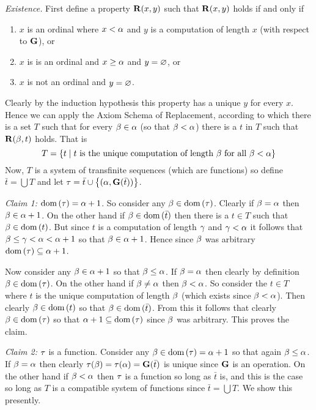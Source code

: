 \begin{questions}
{{      \emph{Existence.} First define a property $\mathbf{R}(x,y)$ such that $\mathbf{R}(x,y)$ holds if and only if
      \begin{enumerate}
        \item $x$ is an ordinal where $x < \alpha$ and $y$ is a computation of length $x$ (with respect to $\mathbf{G}$), or
        \item $x$ is is an ordinal and $x \geq \alpha$ and $y = \varnothing$, or
        \item $x$ is not an ordinal and $y = \varnothing$.
      \end{enumerate}
      Clearly by the induction hypothesis this property has a unique $y$ for every $x$.
      Hence we can apply the Axiom Schema of Replacement, according to which there is a set $T$ such that for every $\beta \in \alpha$ (so that $\beta < \alpha$) there is a $t$ in $T$ such that $\mathbf{R}(\beta, t)$ holds.
      That is
      $$
        T = \left\{ t \mid t \text{ is the unique computation of length $\beta$ for all $\beta < \alpha$} \right\}
      $$
      Now, $T$ is a system of transfinite sequences (which are functions) so define $\bar{t} = \bigcup T$ and let $\tau = \bar{t} \cup \left\{ (\alpha, \mathbf{G}(\bar{t})) \right\}$.

      \emph{Claim 1:} $\mathrm{dom}\,(\tau) = \alpha+1$.
      So consider any $\beta \in \mathrm{dom}\,(\tau)$.
      Clearly if $\beta = \alpha$ then $\beta \in \alpha+1$.
      On the other hand if $\beta \in \mathrm{dom}\,(\bar{t})$ then there is a $t \in T$ such that $\beta \in \mathrm{dom}\,(t)$.
      But since $t$ is a computation of length $\gamma$ and $\gamma < \alpha$ it follows that $\beta \leq \gamma < \alpha < \alpha+1$ so that $\beta \in \alpha+1$.
      Hence since $\beta$ was arbitrary $\mathrm{dom}\,(\tau) \subseteq \alpha+1$.

      Now consider any $\beta \in \alpha+1$ so that $\beta \leq \alpha$.
      If $\beta = \alpha$ then clearly by definition $\beta \in \mathrm{dom}\,(\tau)$.
      On the other hand if $\beta \neq \alpha$ then $\beta < \alpha$.
      So consider the $t \in T$ where $t$ is the unique computation of length $\beta$ (which exists since $\beta < \alpha$).
      Then clearly $\beta \in \mathrm{dom}\,(t)$ so that $\beta \in \mathrm{dom}\,(\bar{t})$.
      From this it follows that clearly $\beta \in \mathrm{dom}\,(\tau)$ so that $\alpha+1 \subseteq \mathrm{dom}\,(\tau)$ since $\beta$ was arbitrary.
      This proves the claim.

      \emph{Claim 2:} $\tau$ is a function.
      Consider any $\beta \in \mathrm{dom}\,(\tau) = \alpha+1$ so that again $\beta \leq \alpha$.
      If $\beta = \alpha$ then clearly $\tau(\beta) = \tau(\alpha) = \mathbf{G}(\bar{t})$ is unique since $\mathbf{G}$ is an operation.
      On the other hand if $\beta < \alpha$ then $\tau$ is a function so long as $\bar{t}$ is, and this is the case so long as $T$ is a compatible system of functions since $\bar{t} = \bigcup T$.
      We show this presently.

}}
\end{questions}
